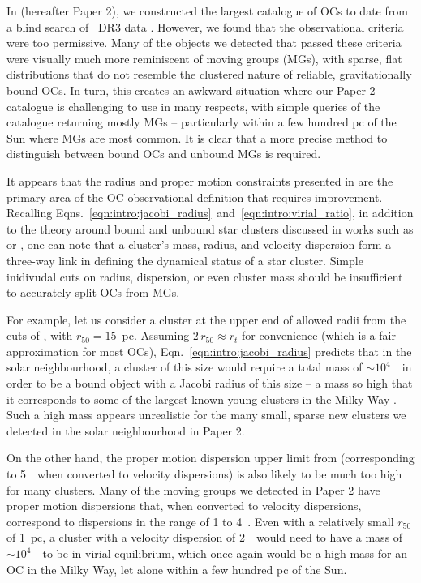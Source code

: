 In \citep{hunt_improving_open_2023} (hereafter Paper 2), we constructed the largest catalogue of OCs to date from a blind search of \gaia\ DR3 data \citep{gaia_collaboration_gaia_2022}. However, we found that the \cite{cantat-gaudin_clusters_2020} observational criteria were too permissive. Many of the objects we detected that passed these criteria were visually much more reminiscent of moving groups (MGs), with sparse, flat distributions that do not resemble the clustered nature of reliable, gravitationally bound OCs. In turn, this creates an awkward situation where our Paper 2 catalogue is challenging to use in many respects, with simple queries of the catalogue returning mostly MGs -- particularly within a few hundred pc of the Sun where MGs are most common. It is clear that a more precise method to distinguish between bound OCs and unbound MGs is required. 

It appears that the radius and proper motion constraints presented in \cite{cantat-gaudin_clusters_2020} are the primary area of the OC observational definition that requires improvement. Recalling Eqns.~\ref{eqn:intro:jacobi_radius}~and~\ref{eqn:intro:virial_ratio}, in addition to the theory around bound and unbound star clusters discussed in works such as \cite{portegies_zwart_young_2010} or \cite{krause_physics_2020}, one can note that a cluster's mass, radius, and velocity dispersion form a three-way link in defining the dynamical status of a star cluster. Simple inidivudal cuts on radius, dispersion, or even cluster mass should be insufficient to accurately split OCs from MGs.

For example, let us consider a cluster at the upper end of allowed radii from the cuts of \cite{cantat-gaudin_clusters_2020}, with $r_{50}=15$~pc. Assuming $2 \, r_{50}\approx r_t$ for convenience (which is a fair approximation for most OCs), Eqn.~\ref{eqn:intro:jacobi_radius} predicts that in the solar neighbourhood, a cluster of this size would require a total mass of $\sim10^4$~\MSun\ in order to be a bound object with a Jacobi radius of this size -- a mass so high that it corresponds to some of the largest known young clusters in the Milky Way \citep{portegies_zwart_young_2010,cantat-gaudin_milky_2022}. Such a high mass appears unrealistic for the many small, sparse new clusters we detected in the solar neighbourhood in Paper 2. 

On the other hand, the proper motion dispersion upper limit from \cite{cantat-gaudin_clusters_2020} (corresponding to 5~\kms\ when converted to velocity dispersions) is also likely to be much too high for many clusters. Many of the moving groups we detected in Paper 2 have proper motion dispersions that, when converted to velocity dispersions, correspond to dispersions in the range of 1 to 4~\kms. Even with a relatively small $r_{50}$ of 1~pc, a cluster with a velocity dispersion of 2~\kms\ would need to have a mass of $\sim10^4$~\MSun\ to be in virial equilibrium, which once again would be a high mass for an OC in the Milky Way, let alone within a few hundred pc of the Sun. 

